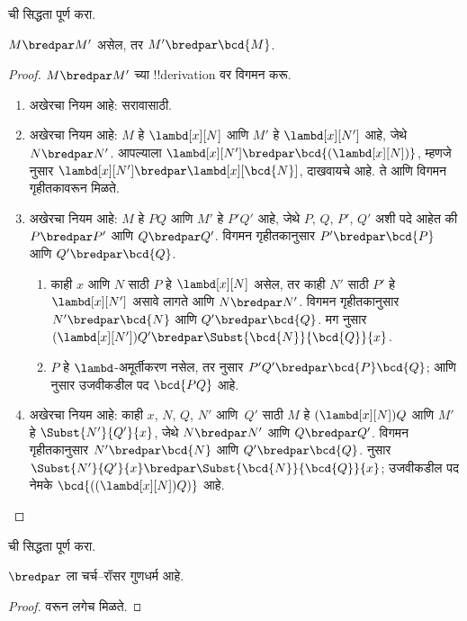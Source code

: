 \documentclass[../../../include/open-logic-section]{subfiles}
\begin{document}
\begin{prob}
   ची सिद्धता पूर्ण करा.
\end{prob}

\begin{lem}
  $M \bredpar M'$ असेल, तर $M' \bredpar \bcd{M}$.
\end{lem}
\begin{proof}
  $M \bredpar M'$ च्या !!{derivation} वर विगमन करू.
  \begin{enumerate}
    \item अखेरचा नियम  आहे: सरावासाठी.
    \item अखेरचा नियम  आहे: $M$ हे
      $\lambd[x][N]$ आणि $M'$ हे $\lambd[x][N']$ आहे,
      जेथे $N \bredpar N'$. आपल्याला $\lambd[x][N'] \bredpar
      \bcd{(\lambd[x][N])}$, म्हणजे  नुसार
      $\lambd[x][N'] \bredpar \lambd[x][\bcd{N}]$,
      दाखवायचे आहे. ते  आणि
      विगमन गृहीतकावरून मिळते.
    \item अखेरचा नियम  आहे: $M$ हे $PQ$
      आणि $M'$ हे $P'Q'$ आहे, जेथे $P$, $Q$, $P'$, $Q'$
      अशी पदे आहेत की $P \bredpar P'$ आणि $Q \bredpar Q'$.
      विगमन गृहीतकानुसार $P' \bredpar \bcd{P}$ आणि
      $Q' \bredpar \bcd{Q}$.
      \begin{enumerate}
        \item काही $x$ आणि $N$ साठी $P$ हे $\lambd[x][N]$
          असेल, तर काही $N'$ साठी $P'$ हे $\lambd[x][N']$
          असावे लागते आणि $N \bredpar N'$. विगमन गृहीतकानुसार
          $N' \bredpar \bcd{N}$ आणि $Q' \bredpar \bcd{Q}$.
          मग  नुसार
          $(\lambd[x][N'])Q' \bredpar
          \Subst{\bcd{N}}{\bcd{Q}}{x}$.
        \item $P$ हे $\lambd$-अमूर्तीकरण नसेल, तर
           नुसार $P'Q' \bredpar
          \bcd{P}\bcd{Q}$; आणि  नुसार
          उजवीकडील पद $\bcd{PQ}$ आहे.
      \end{enumerate}
    \item अखेरचा नियम  आहे: काही
      $x$, $N$, $Q$, $N'$ आणि~$Q'$ साठी $M$ हे
      $(\lambd[x][N])Q$ आणि $M'$ हे $\Subst{N'}{Q'}{x}$,
      जेथे $N \bredpar N'$ आणि $Q \bredpar Q'$.
      विगमन गृहीतकानुसार $N' \bredpar \bcd{N}$ आणि
      $Q' \bredpar \bcd{Q}$.  नुसार
      $\Subst{N'}{Q'}{x} \bredpar \Subst{\bcd{N}}{\bcd{Q}}{x}$;
      उजवीकडील पद नेमके $\bcd{((\lambd[x][N])Q)}$ आहे.
  \end{enumerate}
\end{proof}

\begin{prob}
   ची सिद्धता पूर्ण करा.
\end{prob}

\begin{thm}
  $\bredpar$ ला चर्च–रॉसर गुणधर्म आहे.
\end{thm}

\begin{proof}
   वरून लगेच मिळते.
\end{proof}
\end{document}

